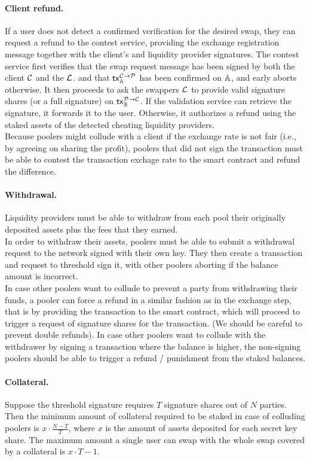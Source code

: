 \paragraph*{Client refund.}
If a user does not detect a confirmed verification for the desired swap, they can request a refund to the contest service, providing the exchange registration message together with the client's and liquidity provider signatures. The contest service first verifies that the swap request message has been signed by both the client $\mathcal{C}$ and the $\mathcal{L}$. and that $\mathsf{tx}^{\mathcal{C} \rightarrow \mathcal{P}}_{\mathbb{A}}$ has been confirmed on $\mathbb{A}$, and early aborts otherwise. It then proceeds to ask the swappers $\mathcal{L}$ to provide valid signature shares (or a full signature) on $\mathsf{tx}^{\mathcal{P} \rightarrow \mathcal{C}}_{\mathbb{B}}$. If the validation service can retrieve the signature, it forwards it to the user. Otherwise, it authorizes a refund using the staked assets of the detected cheating liquidity providers. \\
Because poolers might collude with a client if the exchange rate is not fair (i.e., by agreeing on sharing the profit), poolers that did not sign the transaction must be able to contest the transaction exchage rate to the smart contract and refund the difference.

\paragraph*{Withdrawal.}
Liquidity providers must be able to withdraw from each pool their originally deposited assets plus the fees that they earned.  \\
In order to withdraw their assets, poolers must be able to submit a withdrawal request to the network signed with their own key. They then create a transaction and request to threshold sign it, with other poolers aborting if the balance amount is incorrect. \\
In case other poolers want to collude to prevent a party from withdrawing their funds, a pooler can force a refund in a similar fashion as in the exchange step, that is by providing the transaction to the smart contract, which will proceed to trigger a request of signature shares for the transaction. (We should be careful to prevent double refunds).
In case other poolers want to collude with the withdrawer by signing a transaction where the balance is higher, the non-signing poolers should be able to trigger a refund / punishment from the staked balances.
\paragraph*{Collateral.}
Suppose the threshold signature requires $T$ signature shares out of $N$ parties. Then the minimum amount of collateral required to be staked in case of colluding poolers is $x \cdot \frac{N-T}{T}$, where $x$ is the amount of assets deposited for each secret key share.
The maximum amount a single user can swap with the whole swap covered by a collateral is $x \cdot T-1$.

